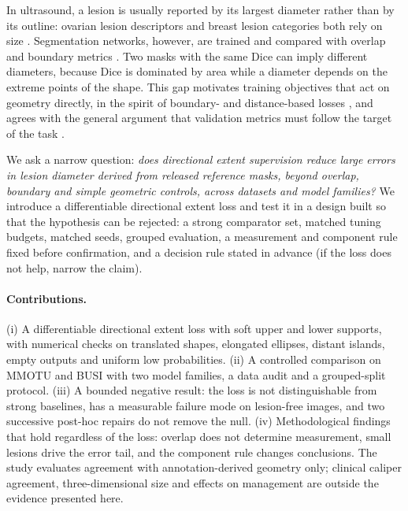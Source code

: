 \documentclass{midl}
\begin{document}
In ultrasound, a lesion is usually reported by its largest diameter rather than by its outline: ovarian lesion descriptors and breast lesion categories both rely on size \citep{timmerman2008iota,acr2013birads}. Segmentation networks, however, are trained and compared with overlap and boundary metrics \citep{ma2021loss}. Two masks with the same Dice can imply different diameters, because Dice is dominated by area while a diameter depends on the extreme points of the shape. This gap motivates training objectives that act on geometry directly, in the spirit of boundary- and distance-based losses \citep{kervadec2019boundary,karimi2020hd}, and agrees with the general argument that validation metrics must follow the target of the task \citep{maierhein2024metrics,reinke2024pitfalls}.

We ask a narrow question: \emph{does directional extent supervision reduce large errors in lesion diameter derived from released reference masks, beyond overlap, boundary and simple geometric controls, across datasets and model families?} We introduce a differentiable directional extent loss and test it in a design built so that the hypothesis can be rejected: a strong comparator set, matched tuning budgets, matched seeds, grouped evaluation, a measurement and component rule fixed before confirmation, and a decision rule stated in advance (if the loss does not help, narrow the claim).

\paragraph{Contributions.} (i) A differentiable directional extent loss with soft upper and lower supports, with numerical checks on translated shapes, elongated ellipses, distant islands, empty outputs and uniform low probabilities. (ii) A controlled comparison on MMOTU \citep{zhao2022mmotu} and BUSI \citep{aldhabyani2020busi} with two model families, a data audit and a grouped-split protocol. (iii) A bounded negative result: the loss is not distinguishable from strong baselines, has a measurable failure mode on lesion-free images, and two successive post-hoc repairs do not remove the null. (iv) Methodological findings that hold regardless of the loss: overlap does not determine measurement, small lesions drive the error tail, and the component rule changes conclusions. The study evaluates agreement with annotation-derived geometry only; clinical caliper agreement, three-dimensional size and effects on management are outside the evidence presented here.
\end{document}
